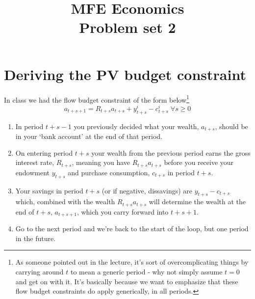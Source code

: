 \documentclass[authoryear,11pt]{elsarticle}
\begin{document}
\begin{frontmatter}
\title{MFE Economics\\Problem set 2}
\end{frontmatter}


\section{Deriving the PV budget constraint}
In class we had the flow budget constraint of the form below\footnote{As someone pointed out in the lecture, it's sort of overcomplicating things by carrying around $t$ to mean a generic period - why not simply assume $t=0$ and get on with it. It's basically because we want to emphasize that these flow budget constraints do apply generically, in all periods.}
\begin{equation}
a_{t+s+1} = R_{t+s} a_{t+s} + y^{i}_{t+s} - c^{i}_{t+s} \; \forall s \geq 0 \label{eqn:flow}
\end{equation}
\begin{enumerate}
\item	In period $t+s-1$ you previously decided what your wealth, $a_{t+s}$, should be in your `bank account' at the end of that period.
\item	On entering period $t+s$ your wealth from the previous period earns the gross interest rate, $R_{t+s}$, meaning you have $R_{t+s} a_{t+s}$ before you receive your endowment $y_{t+s}$ and purchase consumption, $c_{t+s}$ in period $t+s$.
\item	Your savings in period $t+s$ (or if negative, dissavings) are $y_{t+s} - c_{t+s}$ which, combined with the wealth $R_{t+s} a_{t+s}$ will determine the wealth at the end of $t+s$, $a_{t+s+1}$, which you carry forward into $t+s+1$.
\item	Go to the next period and we're back to the start of the loop, but one period in the future.
\end{enumerate}
\end{document}
